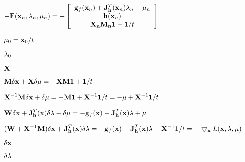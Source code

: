 \documentclass{article}
\def\lthtmlcheckvsize{\ifdim\ht\sizebox<\vsize 
  \ifdim\wd\sizebox<\hsize\expandafter\hfill\fi \expandafter\vfill
  \else\expandafter\vss\fi}%
\begin{document}
{\newpage\clearpage
{}%
$\displaystyle -{\bf F}({\bf x}_n,{\bf\lambda}_n,{\bf\mu}_n)
=-\left[\begin{array}{c}
{\bf g}_f({\bf x}_n)+{\bf J}_{\bf h}^T({\bf x}_n){\bf\lambda}_n-\mu_n\\
{\bf h}({\bf x}_n)\\{\bf X_nM_n1}-{\bf 1}/t
\end{array}\right]$%
\lthtmlindisplaymathZ
\lthtmlcheckvsize\clearpage}

{\newpage\clearpage
{}%
$ {\bf\mu}_0={\bf x}_0/t$%
\lthtmlindisplaymathZ
\lthtmlcheckvsize\clearpage}

{\newpage\clearpage
{}%
$ {\bf\lambda}_0$%
\lthtmlindisplaymathZ
\lthtmlcheckvsize\clearpage}

{\newpage\clearpage
{}%
$ {\bf X}^{-1}$%
\lthtmlindisplaymathZ
\lthtmlcheckvsize\clearpage}

{\newpage\clearpage
{}%
$\displaystyle {\bf M}\delta{\bf x}+{\bf X}\delta{\bf\mu}=-{\bf XM1}+{\bf 1}/t$%
\lthtmlindisplaymathZ
\lthtmlcheckvsize\clearpage}

{\newpage\clearpage
{}%
$\displaystyle {\bf X}^{-1}{\bf M}\delta{\bf x}+\delta{\bf\mu}
=-{\bf M1}+{\bf X}^{-1}{\bf 1}/t=-{\bf\mu}+{\bf X}^{-1}{\bf 1}/t$%
\lthtmlindisplaymathZ
\lthtmlcheckvsize\clearpage}

{\newpage\clearpage
{}%
$\displaystyle {\bf W}\delta{\bf x}+ {\bf J}^T_{\bf h}({\bf x}) \delta{\bf\lambda}
-\delta{\bf\mu}=-{\bf g}_f({\bf x})-{\bf J}_{\bf h}^T({\bf x}){\bf\lambda}+{\bf\mu}$%
\lthtmlindisplaymathZ
\lthtmlcheckvsize\clearpage}

{\newpage\clearpage
{}%
$\displaystyle ({\bf W}+{\bf X}^{-1}{\bf M})\delta{\bf x}+{\bf J}^T_{\bf h}({\bf x})\delta{\bf\lambda}
=-{\bf g}_f({\bf x})-{\bf J}_{\bf h}^T({\bf x}){\bf\lambda}+{\bf X}^{-1}{\bf 1}/t
=-\bigtriangledown_{\bf x}L({\bf x},{\bf\lambda},{\bf\mu})$%
\lthtmlindisplaymathZ
\lthtmlcheckvsize\clearpage}

{\newpage\clearpage
{}%
$ \delta{\bf x}$%
\lthtmlindisplaymathZ
\lthtmlcheckvsize\clearpage}

{\newpage\clearpage
{}%
$ \delta{\bf\lambda}$%
\lthtmlindisplaymathZ
\lthtmlcheckvsize\clearpage}
\end{document}
